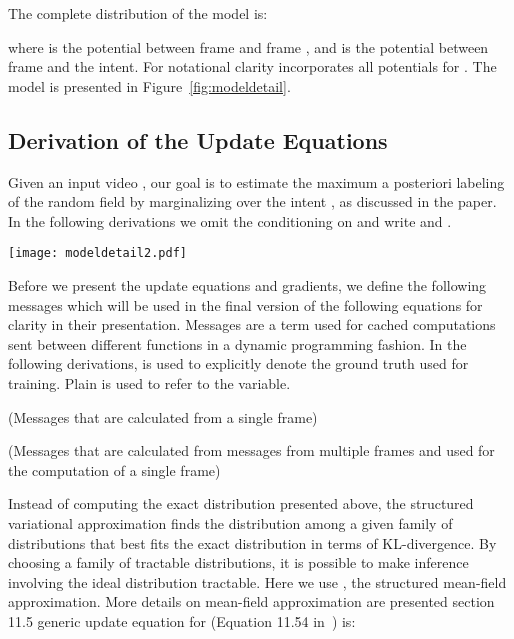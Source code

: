 \documentclass[10pt,twocolumn,letterpaper]{article}
\begin{document}
The complete distribution of the model is:

where  is the potential between frame  and frame , and  is the potential between frame  and the intent. For notational clarity  incorporates all potentials for . The model is presented in Figure~\ref{fig:modeldetail}.


\subsection{Derivation of the Update Equations}
Given an input video , our goal is to estimate the maximum a posteriori labeling of the random field by marginalizing over the intent ,  as discussed in the paper. In the following derivations we omit the conditioning on  and write  and . 


\begin{figure*}[t]
\centering
\texttt{[image: modeldetail2.pdf]}
\caption{The model captures interactions between all frames  and the intent , that is, a fully-connected model. Here shown for . We visualize some of the potentials of the model, and where they fit into the graph. All  share the same parameters, but we calculate the gradients with respect for each of them separately below. For efficient inference, we use a mean-field approximation presented below. A mean-field approximation is a simpler distribution that is fit to the original distribution when needed.}
\label{fig:modeldetail}
\end{figure*}

Before we present the update equations and gradients, we define the following messages which will be used in the final version of the following equations for clarity in their presentation. Messages are a term used for cached computations sent between different functions in a dynamic programming fashion. In the following derivations,  is used to explicitly denote the ground truth used for training. Plain  is used to refer to the variable.

 (Messages that are calculated from a single frame)


 (Messages that are calculated from messages from multiple frames and used for the computation of a single frame)


Instead of computing the exact distribution  presented above, the structured variational approximation finds the distribution  among a given family of distributions that best fits the exact distribution in terms of KL-divergence. By choosing a family of tractable distributions, it is possible to make inference involving the ideal distribution tractable. Here we use , the structured mean-field approximation. More details on mean-field approximation are presented section 11.5 generic update equation for  (Equation 11.54 in~\cite{koller}) is:
\end{document}
